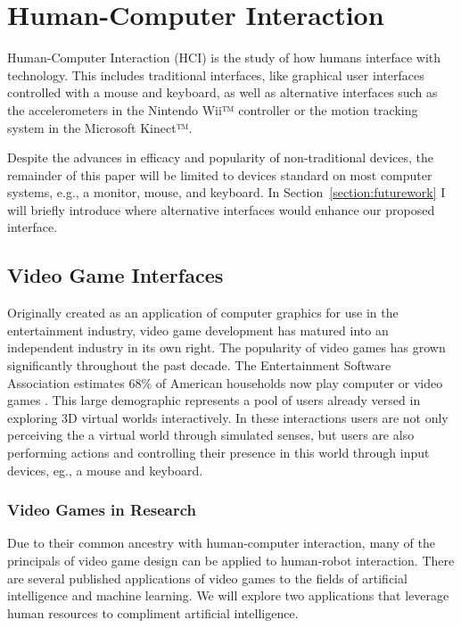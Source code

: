 \chapter{Human-Computer Interaction} %
\label{chapter:hci}
Human-Computer Interaction (HCI) is the study of how humans interface with technology. This includes traditional interfaces, like graphical user interfaces controlled with a mouse and keyboard, as well as alternative interfaces such as the accelerometers in the Nintendo Wii™ controller or the motion tracking system in the Microsoft Kinect™.

Despite the advances in efficacy and popularity of non-traditional devices, the remainder of this paper will be limited to devices standard on most computer systems, e.g., a monitor, mouse, and keyboard. In Section~\ref{section:futurework} I will briefly introduce where alternative interfaces would enhance our proposed interface.

\section{Video Game Interfaces} %
\label{sec:video_game_interfaces}
Originally created as an application of computer graphics for use in the entertainment industry, video game development has matured into an independent industry in its own right. The popularity of video games has grown significantly throughout the past decade. The Entertainment Software Association estimates 68\% of American households now play computer or video games \cite{ESA}. This large demographic represents a pool of users already versed in exploring 3D virtual worlds interactively. In these interactions users are not only perceiving the a virtual world through simulated senses, but users are also performing actions and controlling their presence in this world through input devices, eg., a mouse and keyboard.

\subsection{Video Games in Research} %
\label{sub:video_games_in_research}
Due to their common ancestry with human-computer interaction, many of the principals of video game design can be applied to human-robot interaction. There are several published applications of video games to the fields of artificial intelligence and machine learning. We will explore two applications that leverage human resources to compliment artificial intelligence.

